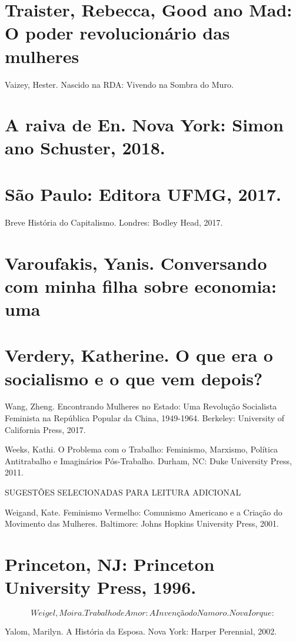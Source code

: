 \section{Traister, Rebecca, Good ano Mad: O poder revolucionário das mulheres}
 \par 
Vaizey, Hester. Nascido na RDA: Vivendo na Sombra do Muro.
 \par 
\section{A raiva de En. Nova York: Simon ano Schuster, 2018.}
 \par 
\section{São Paulo: Editora UFMG, 2017.}
 \par 
Breve História do Capitalismo. Londres: Bodley Head, 2017.
 \par 
\section{Varoufakis, Yanis. Conversando com minha filha sobre economia: uma}
 \par 
\section{Verdery, Katherine. O que era o socialismo e o que vem depois?}
 \par 
Wang, Zheng. Encontrando Mulheres no Estado: Uma Revolução Socialista Feminista na República Popular da China, 1949-1964. Berkeley: University of California Press, 2017.
 \par 
Weeks, Kathi. O Problema com o Trabalho: Feminismo, Marxismo, Política Antitrabalho e Imaginários Pós-Trabalho. Durham, NC: Duke University Press, 2011.
 \par 
SUGESTÕES SELECIONADAS PARA LEITURA ADICIONAL
 \par 
Weigand, Kate. Feminismo Vermelho: Comunismo Americano e a Criação do Movimento das Mulheres. Baltimore: Johns Hopkins University Press, 2001.
 \par 
\section{Princeton, NJ: Princeton University Press, 1996.}
 \par 
\[Weigel, Moira. Trabalho de Amor: A Invenção do Namoro. Nova Iorque:\]
 \par 
Yalom, Marilyn. A História da Esposa. Nova York: Harper Perennial, 2002.
 \par 
